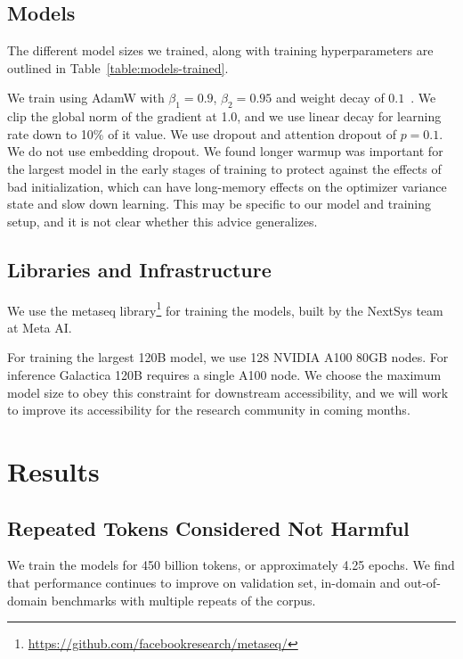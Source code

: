 \subsection{Models}

The different model sizes we trained, along with training hyperparameters are outlined in Table~\ref{table:models-trained}.

We train using AdamW with $\beta_{1}= 0.9$, $\beta_{2} = 0.95$ and weight decay of $0.1$~\citep{AdamW}. We clip the global norm of the gradient at 1.0, and we use linear decay for learning rate down to 10\% of it value. We use dropout and attention dropout of $p=0.1$. We do not use embedding dropout. We found longer warmup was important for the largest model in the early stages of training to protect against the effects of bad initialization, which can have long-memory effects on the optimizer variance state and slow down learning. This may be specific to our model and training setup, and it is not clear whether this advice generalizes.

\subsection{Libraries and Infrastructure}

We use the metaseq library\footnote{\href{https://github.com/facebookresearch/metaseq/}{https://github.com/facebookresearch/metaseq/}} for training the models, built by the NextSys team at Meta AI.

For training the largest 120B model, we use 128 NVIDIA A100 80GB nodes. For inference Galactica 120B requires a single A100 node. We choose the maximum model size to obey this constraint for downstream accessibility, and we will work to improve its accessibility for the research community in coming months.

\section{Results}

\subsection{Repeated Tokens Considered Not Harmful}

We train the models for 450 billion tokens, or approximately 4.25 epochs. We find that performance continues to improve on validation set, in-domain and out-of-domain benchmarks with multiple repeats of the corpus.

